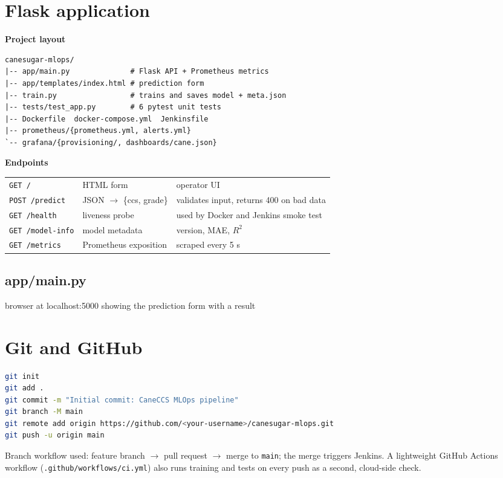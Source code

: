 \documentclass[10pt,a4paper]{article}
\let\oldsection\section
\renewcommand{\section}{\Needspace{14\baselineskip}\oldsection}
\begin{document}
\section{Flask application}
\textbf{Project layout}
\begin{lstlisting}[numbers=none]
canesugar-mlops/
|-- app/main.py              # Flask API + Prometheus metrics
|-- app/templates/index.html # prediction form
|-- train.py                 # trains and saves model + meta.json
|-- tests/test_app.py        # 6 pytest unit tests
|-- Dockerfile  docker-compose.yml  Jenkinsfile
|-- prometheus/{prometheus.yml, alerts.yml}
`-- grafana/{provisioning/, dashboards/cane.json}
\end{lstlisting}

\textbf{Endpoints}\\[2pt]
\begin{tabular}{@{}lll@{}}
\toprule
\texttt{GET /} & HTML form & operator UI\\
\texttt{POST /predict} & JSON $\rightarrow$ \{ccs, grade\} & validates input, returns 400 on bad data\\
\texttt{GET /health} & liveness probe & used by Docker and Jenkins smoke test\\
\texttt{GET /model-info} & model metadata & version, MAE, $R^2$\\
\texttt{GET /metrics} & Prometheus exposition & scraped every 5 s\\
\bottomrule
\end{tabular}

\subsection*{app/main.py}


\begin{shot}{browser at localhost:5000 showing the prediction form with a result}\end{shot}

\section{Git and GitHub}
\begin{lstlisting}[language=bash,numbers=none]
git init
git add .
git commit -m "Initial commit: CaneCCS MLOps pipeline"
git branch -M main
git remote add origin https://github.com/<your-username>/canesugar-mlops.git
git push -u origin main
\end{lstlisting}
Branch workflow used: feature branch $\rightarrow$ pull request $\rightarrow$ merge to \texttt{main}; the merge triggers Jenkins.
A lightweight GitHub Actions workflow (\texttt{.github/workflows/ci.yml}) also runs training and tests on every push as a second, cloud-side check.
\end{document}
